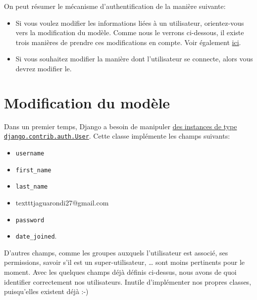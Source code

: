 \documentclass[11pt]{amsbook}
\begin{document}
On peut résumer le mécanisme d’authentification de la manière suivante:


\begin{itemize}

\item Si vous voulez modifier les informations liées à un utilisateur, orientez-vous vers la modification du modèle. Comme nous le verrons ci-dessous, il existe trois manières de prendre ces modifications en compte. Voir également \href{https://docs.djangoproject.com/en/stable/topics/auth/customizing/}{ici}.

\item Si vous souhaitez modifier la manière dont l’utilisateur se connecte, alors vous devrez modifier le.

\end{itemize}


\hypertarget{x-modification-du-modèle}{\section{Modification du modèle}}
Dans un premier temps, Django a besoin de manipuler \href{https://docs.djangoproject.com/en/1.9/ref/contrib/auth/#user-model}{des instances de type \texttt{django.contrib.auth.User}}. Cette classe implémente les champs suivants:


\begin{itemize}

\item \texttt{username}

\item \texttt{first\_name}

\item \texttt{last\_name}

\item textttjaguarondi27@gmail.com

\item \texttt{password}

\item \texttt{date\_joined}.

\end{itemize}


D’autres champs, comme les groupes auxquels l’utilisateur est associé, ses permissions, savoir s’il est un super-utilisateur, …​ sont moins pertinents pour le moment. Avec les quelques champs déjà définis ci-dessus, nous avons de quoi identifier correctement nos utilisateurs. Inutile d’implémenter nos propres classes, puisqu’elles existent déjà :-)
\end{document}

